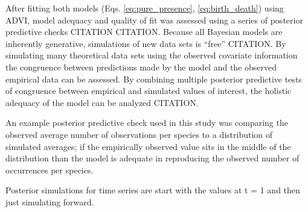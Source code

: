\documentclass[12pt,letterpaper]{article}
\begin{document}
After fitting both models (Eqs. \ref{eq:pure_presence}, \ref{eq:birth_death}) using ADVI, model adequacy and quality of fit was assessed using a series of posterior predictive checks CITATION CITATION. Because all Bayesian models are inherently generative, simulations of new data sets is ``free'' CITATION. By simulating many theoretical data sets using the observed covariate information the congruence between predictions made by the model and the observed empirical data can be assessed. By combining multiple posterior predictive tests of congruence between empirical and simulated values of interest, the holistic adequacy of the model can be analyzed CITATION.

An example posterior predictive check used in this study was comparing the observed average number of observations per species to a distribution of simulated averages; if the empirically observed value sits in the middle of the distribution than the model is adequate in reproducing the observed number of occurrences per species. 

Posterior simulations for time series are start with the values at t = 1 and then just simulating forward. 
\end{document}
